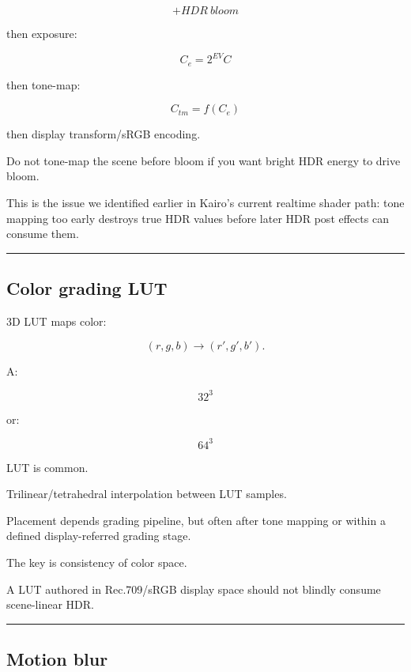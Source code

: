 \[
+
HDR\ bloom
\]

then exposure:

\[
C_e=
2^{EV}C
\]

then tone-map:

\[
C_{tm}=f(C_e)
\]

then display transform/sRGB encoding.

Do not tone-map the scene before bloom if you want bright HDR energy to drive bloom.

This is the issue we identified earlier in Kairo's current realtime shader path: tone mapping too early destroys true HDR values before later HDR post effects can consume them.

\begin{center}\rule{0.5\linewidth}{0.5pt}\end{center}

\subsection{Color grading LUT}\label{04-visual-computing-ii-ch040-color-grading-lut}

\hypertarget{04-visual-computing-ii-ch040-color-grading-lut}{}

3D LUT maps color:

\[
(r,g,b)
\rightarrow
(r',g',b').
\]

A:

\[
32^3
\]

or:

\[
64^3
\]

LUT is common.

Trilinear/tetrahedral interpolation between LUT samples.

Placement depends grading pipeline, but often after tone mapping or within a defined display-referred grading stage.

The key is consistency of color space.

A LUT authored in Rec.709/sRGB display space should not blindly consume scene-linear HDR.

\begin{center}\rule{0.5\linewidth}{0.5pt}\end{center}

\subsection{Motion blur}\label{04-visual-computing-ii-ch040-motion-blur}

\hypertarget{04-visual-computing-ii-ch040-motion-blur}{}

